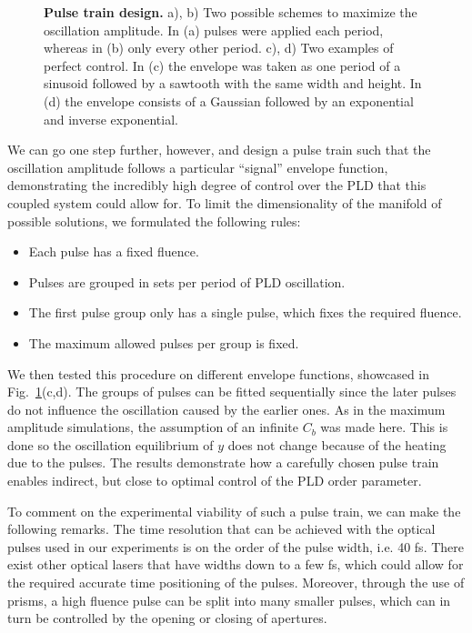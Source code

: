 \begin{figure}
	\caption{\label{fig:Cr_control} {\bf Pulse train design.} a), b) Two possible schemes to maximize the oscillation amplitude. In (a) pulses were applied each period, whereas in (b) only every other period. c), d) Two examples of perfect control. In (c) the envelope was taken as one period of a sinusoid followed by a sawtooth with the same width and height. In (d) the envelope consists of a Gaussian followed by an exponential and inverse exponential.}
\end{figure}
We can go one step further, however, and design a pulse train such that the oscillation amplitude follows a particular ``signal'' envelope function, demonstrating the incredibly high degree of control over the PLD that this coupled system could allow for.  
To limit the dimensionality of the manifold of possible solutions, we formulated the following rules:
\begin{itemize}
	\item Each pulse has a fixed fluence.
	\item Pulses are grouped in sets per period of PLD oscillation.
	\item The first pulse group only has a single pulse, which fixes the required fluence.
	\item The maximum allowed pulses per group is fixed.
\end{itemize}
We then tested this procedure on different envelope functions, showcased in Fig.~\ref{fig:Cr_control}(c,d).
The groups of pulses can be fitted sequentially since the later pulses do not influence the oscillation caused by the earlier ones.
As in the maximum amplitude simulations, the assumption of an infinite $C_b$ was made here.
This is done so the oscillation equilibrium of $y$ does not change because of the heating due to the pulses.
The results demonstrate how a carefully chosen pulse train enables indirect, but close to optimal control of the PLD order parameter.

To comment on the experimental viability of such a pulse train, we can make the following remarks.
The time resolution that can be achieved with the optical pulses used in our experiments is on the order of the pulse width, i.e. 40 fs. There exist other optical lasers that have widths down to a few fs, which could allow for the required accurate time positioning of the pulses.
Moreover, through the use of prisms, a high fluence pulse can be split into many smaller pulses, which can in turn be controlled by the opening or closing of apertures.

